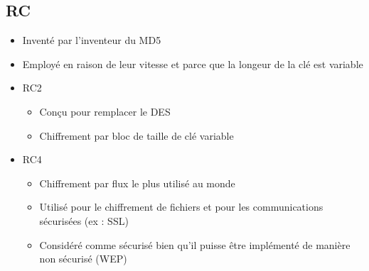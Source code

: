 \documentclass[a4paper]{article}
\begin{document}
\subsection{RC}
\begin{itemize}[label=\textbullet, font=\Large]
    \item Inventé par l'inventeur du MD5
    \item Employé en raison de leur vitesse et parce que la longeur de la clé est variable
    \item RC2
    \begin{itemize}[label=, font=\scriptsize]
        \item Conçu pour remplacer le DES
        \item Chiffrement par bloc de taille de clé variable
    \end{itemize}
    \item RC4
    \begin{itemize}[label=, font=\scriptsize]
        \item Chiffrement par flux le plus utilisé au monde
        \item Utilisé pour le chiffrement de fichiers et pour les communications sécurisées (ex : SSL)
        \item Considéré comme sécurisé bien qu'il puisse être implémenté de manière non sécurisé (WEP)
    \end{itemize}
\end{itemize}
\end{document}
